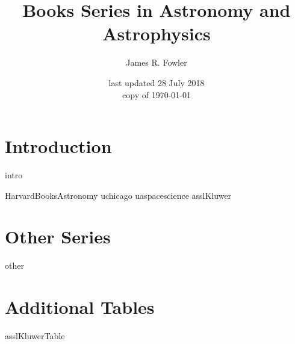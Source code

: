 \documentclass[letterpaper]{article}
\begin{document}
\title{Books Series in Astronomy and Astrophysics}
\author{James R. Fowler}
\date{last updated 28 July 2018\\ copy of \today}

  \maketitle

\tableofcontents
\listoftables


\section{Introduction}
{intro}

{HarvardBooksAstronomy}
{uchicago}
{uaspacescience}
{asslKluwer}

\section{Other Series}
{other}

\section{Additional Tables}

{asslKluwerTable}
\end{document}
